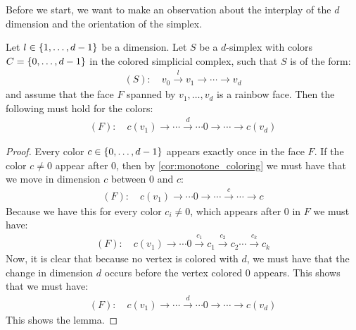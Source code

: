 Before we start, we want to make an observation about the interplay of the $d$ dimension and the orientation of the simplex.
\begin{lemma}
	\label{lem:position_of_d_in_simplex}
	Let $l \in \left\{1, \dots, d-1\right\}$ be a dimension. Let $S$ be a $d$-simplex with colors $C = \left\{0, \dots, d-1\right\}$ in the colored simplicial complex, such that $S$ is of the form:
	\begin{align*}
		(S): \quad v_0 \xrightarrow{l} v_1 \xrightarrow{} \cdots \xrightarrow{} v_d
	\end{align*}
	and assume that the face $F$ spanned by $v_1, \dots, v_d$ is a rainbow face. Then the following must hold for the colors:
	\begin{align*}
		(F): \quad c(v_1) \xrightarrow{}  \cdots \xrightarrow{d} \cdots  0 \xrightarrow{} \cdots \xrightarrow{} c(v_d)
	\end{align*}
\end{lemma}
\begin{proof}
	Every color $c \in \left\{0, \dots, d-1\right\}$ appears exactly once in the face $F$. If the color $c \neq 0$ appear after $0$, then by \cref{cor:monotone_coloring} we must have that we move in dimension $c$ between $0$ and $c$:
	\begin{align*}
		(F): \quad c(v_1) \xrightarrow{} \cdots  0 \xrightarrow{} \cdots \xrightarrow{c} \cdots \xrightarrow{} c
	\end{align*}
	Because we have this for every color $c_i \neq 0$, which appears after $0$ in $F$ we must have:
	\begin{align*}
		(F): \quad c(v_1) \xrightarrow{} \cdots  0 \xrightarrow{c_1} c_1 \xrightarrow{c_2} c_2 \cdots \xrightarrow{c_k} c_k
	\end{align*}
	Now, it is clear that because no vertex is colored with $d$, we must have that the change in dimension $d$ occurs before the vertex colored $0$ appears. This shows that we must have:
	\begin{align*}
		(F): \quad c(v_1) \xrightarrow{}  \cdots \xrightarrow{d} \cdots  0 \xrightarrow{} \cdots \xrightarrow{} c(v_d)
	\end{align*}
	This shows the lemma.
\end{proof}

